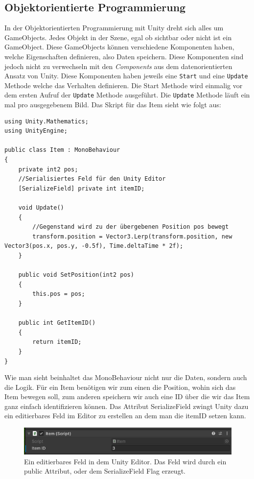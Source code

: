 \documentclass[12pt, titlepage]{article}
\DeclareRobustCommand{\#}{\adjustbox{valign=B,totalheight=.57\baselineskip}{\oldhash}}%
\begin{document}
\subsection{Objektorientierte Programmierung}
In der Objektorientierten Programmierung mit Unity dreht sich alles um GameObjects. Jedes Objekt in der Szene, egal ob sichtbar oder nicht ist ein GameObject. Diese GameObjects können verschiedene Komponenten haben, welche Eigenschaften definieren, also Daten speichern. Diese Komponenten sind jedoch nicht zu verwechseln mit den \textit{Components} aus dem datenorientierten Ansatz von Unity. Diese Komponenten haben jeweils eine \texttt{Start} und eine \texttt{Update} Methode welche das Verhalten definieren. Die Start Methode wird einmalig vor dem ersten Aufruf der \texttt{Update} Methode ausgeführt. Die \texttt{Update} Methode läuft ein mal pro ausgegebenem Bild. Das Skript für das Item sieht wie folgt aus:
\begin{lstlisting}[style=code, caption={Item Komponente OOP}]
using Unity.Mathematics;
using UnityEngine;

public class Item : MonoBehaviour
{
    private int2 pos;
    //Serialisiertes Feld für den Unity Editor
    [SerializeField] private int itemID;

    void Update()
    {
    	//Gegenstand wird zu der übergebenen Position pos bewegt
        transform.position = Vector3.Lerp(transform.position, new Vector3(pos.x, pos.y, -0.5f), Time.deltaTime * 2f);
    }

    public void SetPosition(int2 pos)
    {
        this.pos = pos;
    }

    public int GetItemID()
    {
        return itemID;
    }
}
\end{lstlisting}
Wie man sieht beinhaltet das MonoBehaviour nicht nur die Daten, sondern auch die Logik. Für ein Item benötigen wir zum einen die Position, wohin sich das Item bewegen soll, zum anderen speichern wir auch eine ID über die wir das Item ganz einfach identifizieren können. Das Attribut \glqq SerializeField\grqq{} zwingt Unity dazu ein editierbares Feld im Editor zu erstellen an dem man die itemID setzen kann.
\begin{figure}[H]
\includegraphics[scale=1]{Bilder/SerializeField.png}
\caption{Ein editierbares Feld in dem Unity Editor. Das Feld wird durch ein public Attribut, oder dem SerializeField Flag erzeugt.}
\label{fig:SerializeField}
\end{figure}
\end{document}
